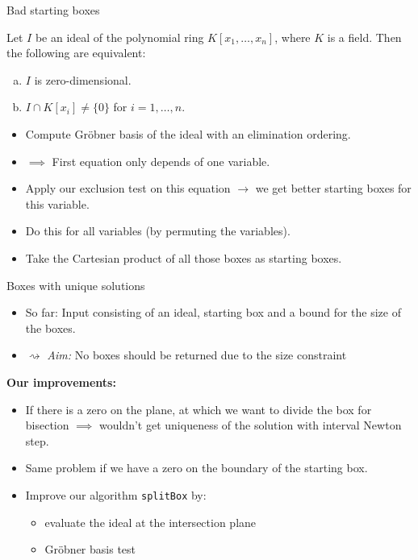 \documentclass[german,10pt,xcolor=colortbl,compress,handout]{beamer}
\begin{document}
\begin{frame}{Bad starting boxes}
    \pause
    \begin{lemma}
        Let $I$ be an ideal of the polynomial ring $K[x_1, \hdots, x_n]$, where $K$ is a
        field. Then the following are equivalent:
        \begin{enumerate}[a)]
            \item $I$ is zero-dimensional.
            \item $I \cap K[x_i] \neq \{0\}$ for $i=1,\hdots, n$.
        \end{enumerate}
        \pause
    \end{lemma}

    \begin{itemize}
        \item Compute Gröbner basis of the ideal with an elimination ordering.
        \pause
        \item[] $\implies$ First equation only depends of one variable.
        \pause
        \item Apply our exclusion test on this equation $\rightarrow$ we get better
            starting boxes for this variable.
        \item Do this for all variables (by permuting the variables).
        \item Take the Cartesian product of all those boxes as starting boxes.
    \end{itemize}
\end{frame}

\begin{frame}{Boxes with unique solutions}
    \begin {itemize}
        \item So far: Input consisting of an ideal, starting box and a bound for the size
            of the boxes.
        \item[]$\rightsquigarrow$ \emph{Aim:} No boxes should be returned due to the size
            constraint
    \end{itemize}
    \pause
    \textbf{Our improvements:}
    \begin{itemize}
        \pause
        \item If there is a zero on the plane, at which we want to divide the box for
            bisection $\implies$ wouldn't get uniqueness of the solution with interval
            Newton step.
        \item Same problem if we have a zero on the boundary of the starting box.
        \pause
        \item Improve our algorithm \texttt{splitBox} by:
        \pause
        \begin{itemize}
            \item evaluate the ideal at the intersection plane
            \item Gröbner basis test
        \end{itemize}
    \end{itemize}
\end{frame}
\end{document}
